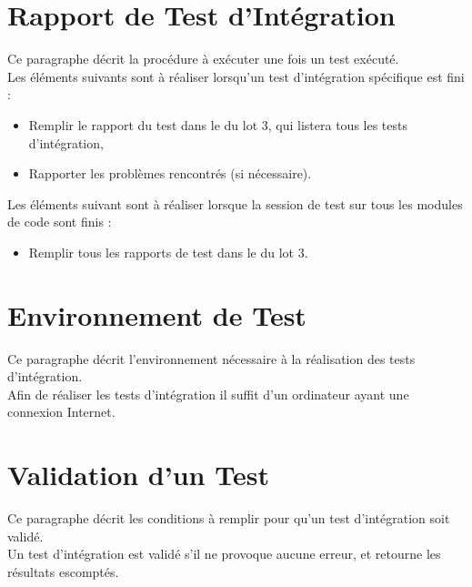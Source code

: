   \section{Rapport de Test d'Intégration}  
  	Ce paragraphe décrit la procédure à exécuter une fois un test exécuté.  \\
  	
  	Les éléments suivants sont à réaliser lorsqu'un test d'intégration spécifique est fini : 
  	\begin{itemize}
  		\item Remplir le rapport du test dans le \JTI du lot 3, qui listera tous les tests d'intégration,
  		\item Rapporter les problèmes rencontrés (si nécessaire).
  	\end{itemize}
  	
  	Les éléments suivant sont à réaliser lorsque la session de test sur tous les modules de code sont finis : 
  	\begin{itemize}
  		\item Remplir tous les rapports de test dans le \JTI du lot 3.
  	\end{itemize}
  
  \section{Environnement de Test}
	  Ce paragraphe décrit l'environnement nécessaire à la réalisation des tests d'intégration. \\
	  
	  Afin de réaliser les tests d'intégration il suffit d'un ordinateur ayant une connexion Internet.
  
  \section{Validation d'un Test}
	Ce paragraphe décrit les conditions à remplir pour qu'un test d'intégration soit validé.\\
  
  	Un test d'intégration est validé s'il ne provoque aucune erreur, et retourne les résultats escomptés. 
  	
  	